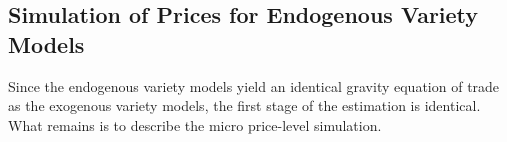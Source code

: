 \documentclass[12pt,dvips, ps2pdf]{article}
\begin{document}
%
%
%

\subsection{Simulation of Prices for Endogenous Variety Models}

Since the endogenous variety models yield an identical gravity equation of trade as the exogenous variety models, the first stage of the estimation is identical. What remains is to describe the micro price-level simulation.
\end{document}
